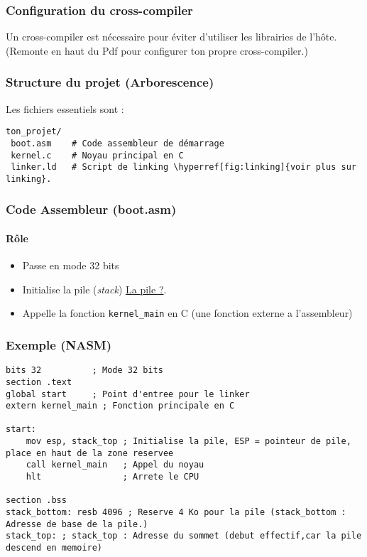 \documentclass{article}
\begin{document}
\subsubsection*{Configuration du cross-compiler}
Un cross-compiler est nécessaire pour éviter d'utiliser les librairies de l'hôte.\\
    (Remonte en haut du Pdf pour configurer ton propre cross-compiler.)

\subsubsection*{Structure du projet (Arborescence)}
Les fichiers essentiels sont :

\begin{verbatim}
ton_projet/
 boot.asm    # Code assembleur de démarrage
 kernel.c    # Noyau principal en C
 linker.ld   # Script de linking \hyperref[fig:linking]{voir plus sur linking}.
\end{verbatim}

\subsubsection*{Code Assembleur (boot.asm)}
\paragraph{Rôle}
\begin{itemize}
    \item Passe en mode 32 bits
    \item Initialise la pile (\textit{stack}) \hyperref[fig:pilenasm]{La pile ?}.
    \item Appelle la fonction \texttt{kernel\_main} en C (une fonction externe a l'assembleur)
\end{itemize}

\subsubsection*{Exemple (NASM)}
\begin{lstlisting}[language=assembler]
bits 32          ; Mode 32 bits
section .text
global start     ; Point d'entree pour le linker
extern kernel_main ; Fonction principale en C

start:
    mov esp, stack_top ; Initialise la pile, ESP = pointeur de pile, place en haut de la zone reservee
    call kernel_main   ; Appel du noyau
    hlt                ; Arrete le CPU

section .bss
stack_bottom: resb 4096 ; Reserve 4 Ko pour la pile (stack_bottom : Adresse de base de la pile.)
stack_top: ; stack_top : Adresse du sommet (debut effectif,car la pile descend en memoire)
\end{lstlisting}
\end{document}
